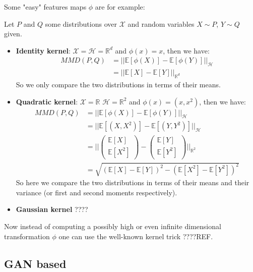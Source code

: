 Some "easy" features maps $\phi$ are for example:
\begin{ex}
    Let $P$ and $Q$ some distributions over $\mathcal{X}$ and random variables $X \sim P$, $Y \sim Q$ given.
    \begin{itemize}
        \item \textbf{Identity kernel}: $\mathcal{X}=\mathcal{H}=\mathbb{R}^d$ and $\phi(x)=x$, then we have:
        \begin{align}
            MMD(P,Q) &= || \mathbb{E}[\phi(X)] - \mathbb{E}[\phi(Y)] ||_\mathcal{H} \nonumber \\
            &= || \mathbb{E}[X] - \mathbb{E}[Y] ||_{\mathbb{R}^d}
        \end{align}
        So we only compare the two distributions in terms of their means. 

        \item \textbf{Quadratic kernel}: $\mathcal{X}=\mathbb{R}$ $\mathcal{H}=\mathbb{R}^2$ and $\phi(x)=(x, x^2)$, then we have:
        \begin{align}
            MMD(P,Q) &= || \mathbb{E}[\phi(X)] - \mathbb{E}[\phi(Y)] ||_\mathcal{H} \nonumber \\
            &= || \mathbb{E}[(X, X^2)] - \mathbb{E}[(Y, Y^2)] ||_\mathcal{H} \nonumber \\
            &= || \begin{pmatrix}
                \mathbb{E}[X] \\ \mathbb{E}[X^2]
            \end{pmatrix} - \begin{pmatrix}
                \mathbb{E}[Y] \\ \mathbb{E}[Y^2]
            \end{pmatrix} ||_{\mathbb{R}^2} \nonumber \\
            &= \sqrt{(\mathbb{E}[X] - \mathbb{E}[Y])^2 - (\mathbb{E}[X^2] - \mathbb{E}[Y^2])^2}
        \end{align}
        So here we compare the two distributions in terms of their means and their variance (or first and second moments respectively).
        \item \textbf{Gaussian kernel} ????
    \end{itemize}
\end{ex}

Now instead of computing a possibly high or even infinite dimensional transformation $\phi$ one can use the well-known kernel trick ????REF. 

\subsection{GAN based} 